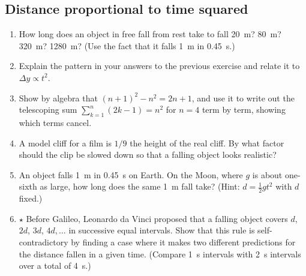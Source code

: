 \documentclass[11pt,twoside,openany]{book}
\begin{document}
\subsection*{Distance proportional to time squared}
\begin{enumerate}[label=\textbf{\thechapter.\arabic*},resume=exercises,leftmargin=*]
  \item How long does an object in free fall from rest take to fall \SI{20}{\metre}? \SI{80}{\metre}? \SI{320}{\metre}? \SI{1280}{\metre}? (Use the fact that it falls \SI{1}{\metre} in \SI{0.45}{\second}.)
  \item Explain the pattern in your answers to the previous exercise and relate it to $\Delta y \propto t^2$.
  \item Show by algebra that $(n+1)^2 - n^2 = 2n + 1$, and use it to write out the telescoping sum $\sum_{k=1}^{n}(2k-1) = n^2$ for $n = 4$ term by term, showing which terms cancel.\label{ex:algebra}
  \item A model cliff for a film is $1/9$ the height of the real cliff. By what factor should the clip be slowed down so that a falling object looks realistic?
  \item An object falls \SI{1}{\metre} in \SI{0.45}{\second} on Earth. On the Moon, where $g$ is about one-sixth as large, how long does the same \SI{1}{\metre} fall take? (Hint: $d = \tfrac12 g t^2$ with $d$ fixed.)
  \item $\star$ Before Galileo, Leonardo da Vinci proposed that a falling object covers $d$, $2d$, $3d$, $4d, \ldots$ in successive equal intervals. Show that this rule is self-contradictory by finding a case where it makes two different predictions for the distance fallen in a given time. (Compare \SI{1}{\second} intervals with \SI{2}{\second} intervals over a total of \SI{4}{\second}.)
\end{enumerate}
\end{document}
